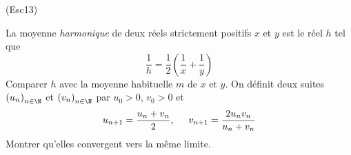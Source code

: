 \begin{tiny}(Esc13)\end{tiny} La moyenne \emph{harmonique} de deux réels strictement positifs $x$ et $y$ est le réel $h$ tel que
\begin{displaymath}
 \frac{1}{h}=\frac{1}{2}\left( \frac{1}{x} + \frac{1}{y}\right) 
\end{displaymath}
Comparer $h$ avec la moyenne habituelle $m$ de $x$ et $y$.\newline
On définit deux suites $\left( u_n\right) _{n\in \N}$ et $\left( v_n\right) _{n\in \N}$ par $u_0>0$, $v_0>0$ et
\begin{displaymath}
 u_{n+1}=\frac{u_n + v_n}{2},\hspace{0.5cm}
v_{n+1} = \frac{2u_n v_n}{u_n + v_n}
\end{displaymath}
Montrer qu'elles convergent vers la m\^eme limite.